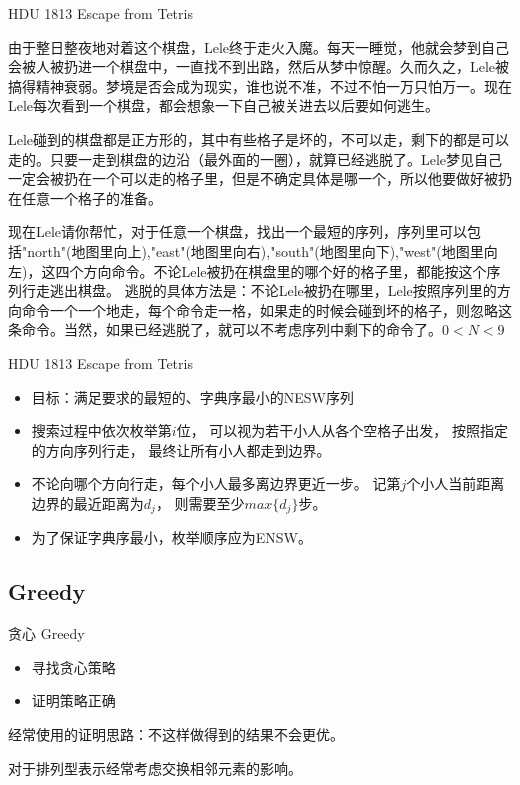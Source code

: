 \documentclass{beamer}
\begin{document}
\begin{frame}{HDU 1813 Escape from Tetris}

    由于整日整夜地对着这个棋盘，Lele终于走火入魔。每天一睡觉，他就会梦到自己会被人被扔进一个棋盘中，一直找不到出路，然后从梦中惊醒。久而久之，Lele被搞得精神衰弱。梦境是否会成为现实，谁也说不准，不过不怕一万只怕万一。现在Lele每次看到一个棋盘，都会想象一下自己被关进去以后要如何逃生。
    
    Lele碰到的棋盘都是正方形的，其中有些格子是坏的，不可以走，剩下的都是可以走的。只要一走到棋盘的边沿（最外面的一圈），就算已经逃脱了。Lele梦见自己一定会被扔在一个可以走的格子里，但是不确定具体是哪一个，所以他要做好被扔在任意一个格子的准备。
    
    现在Lele请你帮忙，对于任意一个棋盘，找出一个最短的序列，序列里可以包括"north"(地图里向上),"east"(地图里向右),"south"(地图里向下),"west"(地图里向左)，这四个方向命令。不论Lele被扔在棋盘里的哪个好的格子里，都能按这个序列行走逃出棋盘。
    逃脱的具体方法是：不论Lele被扔在哪里，Lele按照序列里的方向命令一个一个地走，每个命令走一格，如果走的时候会碰到坏的格子，则忽略这条命令。当然，如果已经逃脱了，就可以不考虑序列中剩下的命令了。$0<N<9$
    
\end{frame}

\begin{frame}{HDU 1813 Escape from Tetris}

    \begin{itemize}
        \item 目标：满足要求的最短的、字典序最小的NESW序列
        \item 
        搜索过程中依次枚举第$i$位，
        可以视为若干小人从各个空格子出发，
        按照指定的方向序列行走，
        最终让所有小人都走到边界。
        \item 
        不论向哪个方向行走，每个小人最多离边界更近一步。
        记第$j$个小人当前距离边界的最近距离为$d_j$，
        则需要至少$max\{d_j\}$步。
        \item 
        为了保证字典序最小，枚举顺序应为ENSW。
    \end{itemize}
    
\end{frame}

\subsection{Greedy}

\begin{frame}{贪心 Greedy}

    \begin{itemize}
        \item 寻找贪心策略
        \item 证明策略正确
    \end{itemize}

    经常使用的证明思路：不这样做得到的结果不会更优。

    对于排列型表示经常考虑交换相邻元素的影响。
    
\end{frame}
\end{document}
